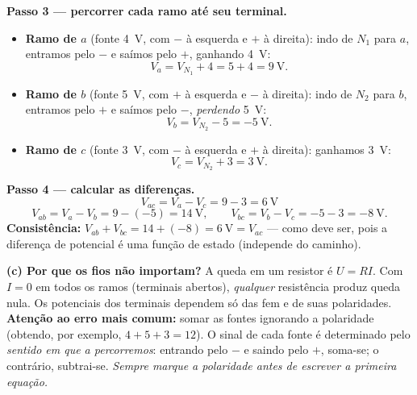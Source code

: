 \begin{questao}[3]{}
{\textbf{Passo 3 --- percorrer cada ramo até seu terminal.}
\begin{itemize}[leftmargin=1.7em,itemsep=2pt,topsep=3pt]
\item \textbf{Ramo de $a$} (fonte \SI{4}{\volt}, com $-$ à esquerda e $+$ à
      direita): indo de $N_1$ para $a$, entramos pelo $-$ e saímos pelo $+$,
      ganhando \SI{4}{\volt}:
      \[V_a = V_{N_1}+4 = 5+4=\SI{9}{\volt}.\]
\item \textbf{Ramo de $b$} (fonte \SI{5}{\volt}, com $+$ à esquerda e $-$ à
      direita): indo de $N_2$ para $b$, entramos pelo $+$ e saímos pelo $-$,
      \emph{perdendo} \SI{5}{\volt}:
      \[V_b = V_{N_2}-5 = \SI{-5}{\volt}.\]
\item \textbf{Ramo de $c$} (fonte \SI{3}{\volt}, com $-$ à esquerda e $+$ à
      direita): ganhamos \SI{3}{\volt}:
      \[V_c = V_{N_2}+3 = \SI{3}{\volt}.\]
\end{itemize}

\textbf{Passo 4 --- calcular as diferenças.}
\[
\boxed{\;V_{ac}=V_a-V_c = 9-3 = \SI{6}{\volt}\;}
\]
\[
V_{ab}=V_a-V_b = 9-(-5)=\SI{14}{\volt},
\qquad
V_{bc}=V_b-V_c = -5-3=\SI{-8}{\volt}.
\]
\textbf{Consistência:} $V_{ab}+V_{bc} = 14+(-8) = \SI{6}{\volt} = V_{ac}$
\checkmark --- como deve ser, pois a diferença de potencial é uma função de
estado (independe do caminho).

\medskip
\textbf{(c) Por que os fios não importam?} A queda em um resistor é $U=RI$. Com
$I=0$ em todos os ramos (terminais abertos), \emph{qualquer} resistência produz
queda nula. Os potenciais dos terminais dependem só das fem e de suas
polaridades.\\
\textbf{Atenção ao erro mais comum:} somar as fontes ignorando a polaridade
(obtendo, por exemplo, $4+5+3=12$). O sinal de cada fonte é determinado pelo
\emph{sentido em que a percorremos}: entrando pelo $-$ e saindo pelo $+$, soma-se;
o contrário, subtrai-se. \emph{Sempre marque a polaridade antes de escrever a
primeira equação.}}
\end{questao}

\blocodesafio

